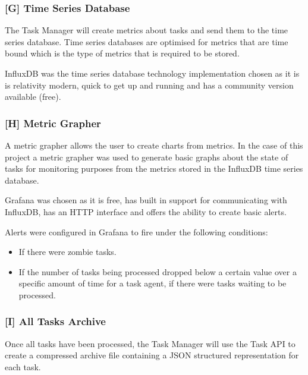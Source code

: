 \documentclass{mscreport}
\begin{document}
\subsubsection{[G] Time Series Database}

The Task Manager will create metrics about tasks and send them to the time series database. Time series databases are optimised for metrics that are time bound which is the type of metrics that is required to be stored. 

\vspace{0.3cm} \noindent
InfluxDB was the time series database technology implementation chosen as it is is relativity modern, quick to get up and running and has a community version available (free).

\subsubsection{[H] Metric Grapher}

A metric grapher allows the user to create charts from metrics. In the case of this project a metric grapher was used to generate basic graphs about the state of tasks for monitoring purposes from the metrics stored in the InfluxDB time series database.

\vspace{0.3cm} \noindent
Grafana was chosen as it is free, has built in support for communicating with InfluxDB, has an HTTP interface and offers the ability to create basic alerts.

\vspace{0.3cm} \noindent
Alerts were configured in Grafana to fire under the following conditions:

\begin{itemize}
	\setlength\itemsep{0.1em}
    \item If there were zombie tasks.
    \item If the number of tasks being processed dropped below a certain value over a specific amount of time for a task agent, if there were tasks waiting to be processed.
\end{itemize}

\subsubsection{[I] All Tasks Archive}

Once all tasks have been processed, the Task Manager will use the Task API to create a compressed archive file containing a JSON structured representation for each task.
\end{document}
